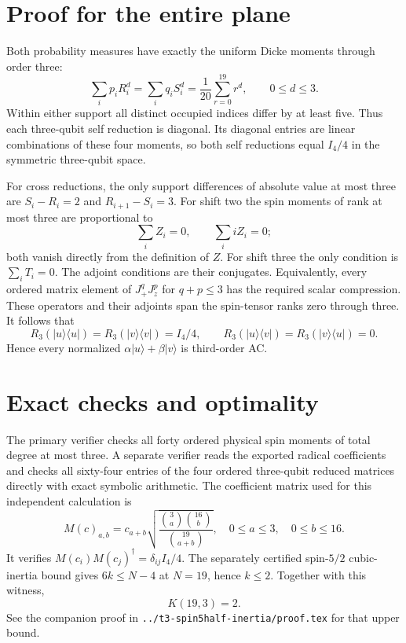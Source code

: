 \documentclass[11pt]{article}
\begin{document}
\section{Proof for the entire plane}
Both probability measures have exactly the uniform Dicke moments through
order three:
\[
 \sum_i p_iR_i^d=\sum_i q_iS_i^d
 =\frac1{20}\sum_{r=0}^{19}r^d,\qquad 0\leq d\leq3.
\]
Within either support all distinct occupied indices differ by at least five.
Thus each three-qubit self reduction is diagonal. Its diagonal entries are
linear combinations of these four moments, so both self reductions equal
$I_4/4$ in the symmetric three-qubit space.

For cross reductions, the only support differences of absolute value at most
three are $S_i-R_i=2$ and $R_{i+1}-S_i=3$. For shift two the spin moments of
rank at most three are proportional to
\[
 \sum_i Z_i=0,\qquad \sum_i iZ_i=0;
\]
both vanish directly from the definition of $Z$. For shift three the only
condition is $\sum_iT_i=0$. The adjoint conditions are their conjugates.
Equivalently, every ordered matrix element of
$J_+^qJ_z^p$ for $q+p\leq3$ has the required scalar compression. These
operators and their adjoints span the spin-tensor ranks zero through three.
It follows that
\[
 R_3(|u\rangle\langle u|)=R_3(|v\rangle\langle v|)=I_4/4,
 \qquad R_3(|u\rangle\langle v|)=R_3(|v\rangle\langle u|)=0.
\]
Hence every normalized $\alpha|u\rangle+\beta|v\rangle$ is third-order AC.

\section{Exact checks and optimality}
The primary verifier checks all forty ordered physical spin moments of total
degree at most three. A separate verifier reads the exported radical
coefficients and checks all sixty-four entries of the four ordered
three-qubit reduced matrices directly with exact symbolic arithmetic. The
coefficient matrix used for this independent calculation is
\[
 M(c)_{a,b}=c_{a+b}
 \sqrt{\frac{\binom3a\binom{16}b}{\binom{19}{a+b}}},
 \quad 0\leq a\leq3,\quad0\leq b\leq16.
\]
It verifies $M(c_i)M(c_j)^\dagger=\delta_{ij}I_4/4$.
The separately certified spin-$5/2$ cubic-inertia bound gives
$6k\leq N-4$ at $N=19$, hence $k\leq2$. Together with this witness,
\[
 \boxed{K(19,3)=2.}
\]
See the companion proof in
\texttt{../t3-spin5half-inertia/proof.tex} for that upper bound.
\end{document}
